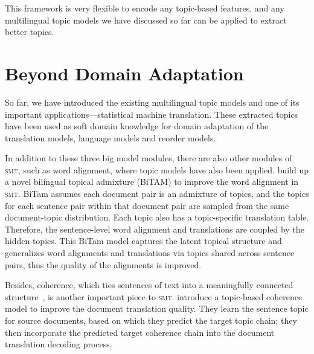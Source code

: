 This framework is very flexible to encode any topic-based features, and any multilingual topic models we have discussed so far can be applied to extract better topics.


\section{Beyond Domain Adaptation}

So far, we have introduced the existing multilingual topic models and one of its important applications---statistical machine translation. These extracted topics have been used as soft domain knowledge for domain adaptation of the translation models, language models and reorder models. 

In addition to these three big model modules, there are also other modules of \textsc{smt}, such as word alignment, where topic models have also been applied. \citet{zhao-06} build up a novel bilingual topical admixture (BiTAM) to improve the word alignment in \textsc{smt}. BiTam assumes each document pair is an admixture of topics, and the topics for each sentence pair within that document pair are sampled from the same document-topic distribution. Each topic also has a topic-specific translation table. Therefore, the sentence-level word alignment and translations are coupled by the hidden topics. This BiTam model captures the latent topical structure and generalizes word alignments and translations via topics shared across sentence pairs, thus the quality of the alignments is improved.

Besides, coherence, which ties sentences of text into a meaningfully connected structure~\citep{xiong-13}, is another important piece to \textsc{smt}.\citet{xiong-13} introduce a topic-based coherence model to improve the document translation quality. They learn the sentence topic for source documents, based on which they predict the target topic chain; they then incorporate the predicted target coherence chain into the document translation decoding process.




